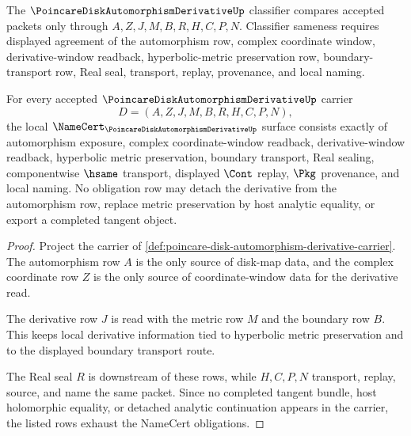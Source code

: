 \begin{definition}
\label{def:poincare-disk-automorphism-derivative-classifier}
The $\PoincareDiskAutomorphismDerivativeUp$ classifier compares accepted packets only through $A,Z,J,M,B,R,H,C,P,N$. Classifier sameness requires displayed agreement of the automorphism row, complex coordinate window, derivative-window readback, hyperbolic-metric preservation row, boundary-transport row, Real seal, transport, replay, provenance, and local naming.
\end{definition}

\begin{theorem}
\label{thm:poincare-disk-automorphism-derivative-namecert-obligations}
For every accepted $\PoincareDiskAutomorphismDerivativeUp$ carrier
$$
D=(A,Z,J,M,B,R,H,C,P,N),
$$
the local $\NameCert_{\PoincareDiskAutomorphismDerivativeUp}$ surface consists exactly of automorphism exposure, complex coordinate-window readback, derivative-window readback, hyperbolic metric preservation, boundary transport, Real sealing, componentwise $\hsame$ transport, displayed $\Cont$ replay, $\Pkg$ provenance, and local naming. No obligation row may detach the derivative from the automorphism row, replace metric preservation by host analytic equality, or export a completed tangent object.
\end{theorem}
\begin{proof}
Project the carrier of \autoref{def:poincare-disk-automorphism-derivative-carrier}. The automorphism row $A$ is the only source of disk-map data, and the complex coordinate row $Z$ is the only source of coordinate-window data for the derivative read.

The derivative row $J$ is read with the metric row $M$ and the boundary row $B$. This keeps local derivative information tied to hyperbolic metric preservation and to the displayed boundary transport route.

The Real seal $R$ is downstream of these rows, while $H,C,P,N$ transport, replay, source, and name the same packet. Since no completed tangent bundle, host holomorphic equality, or detached analytic continuation appears in the carrier, the listed rows exhaust the NameCert obligations.
\end{proof}

